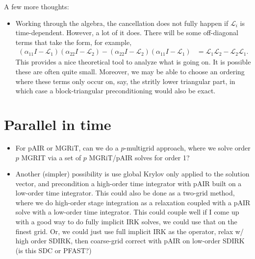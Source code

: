 \documentclass[a4paper,10pt]{article}
\begin{document}
%
{\color{blue}A few more thoughts:
\begin{itemize}
\item Working through the algebra, the cancellation does not fully happen if $\mathcal{L}_i$
is time-dependent. However, a lot of it does. There will be some off-diagonal terms that take
the form, for example,
%
\begin{align*}
(\alpha_{11}I - \mathcal{L}_1)(\alpha_{22}I - \mathcal{L}_2) - 
	(\alpha_{22}I - \mathcal{L}_2)(\alpha_{11}I - \mathcal{L}_1)
& = \mathcal{L}_1\mathcal{L}_2 - \mathcal{L}_2\mathcal{L}_1.
\end{align*}
%
This provides a nice theoretical tool to analyze what is going on. It is possible these are often
quite small. Moreover, we may be able to choose an ordering where these terms only occur on,
say, the stritly lower triangular part, in which case a block-triangular preconditioning would also
be exact. 

\end{itemize}
}
%

\section{Parallel in time}

\begin{itemize}
	\item For pAIR or MGRiT, can we do a $p$-multigrid approach, where we solve order $p$ MGRIT
	via a set of $p$ MGRiT/pAIR solves for order 1? 
	\item Another (simpler) possibility is use global Krylov only applied to the solution vector,
	and precondition a high-order time integrator with pAIR built on a low-order time integrator.
	This could also be done as a two-grid method, where we do high-order stage integration as a
	relaxation coupled with a pAIR solve with a low-order time integrator. This could couple well
	if I come up with a good way to do fully implicit IRK solves, we could use that on the finest
	grid. Or, we could just use full implicit IRK as the operator, relax w/ high order SDIRK,
	then coarse-grid correct with pAIR on low-order SDIRK (is this SDC or PFAST?)
\end{itemize}
\end{document}

